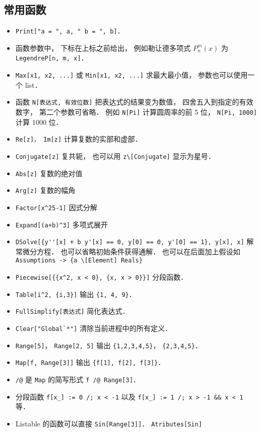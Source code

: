 \subsection{常用函数}
\begin{itemize}
\item \verb|Print["a = ", a, " b = ", b]|．
\item 函数参数中， 下标在上标之前给出， 例如勒让德多项式 $P_n^m(x)$ 为 \verb|LegendreP[n, m, x]|．
\item \verb|Max[x1, x2, ...]| 或 \verb|Min[x1, x2, ...]| 求最大最小值， 参数也可以使用一个 list．
\item 函数 \verb|N[表达式, 有效位数]| 把表达式的结果变为数值， 四舍五入到指定的有效数字， 第二个参数可省略． 例如 \verb|N[Pi]| 计算圆周率的前 5 位， \verb|N[Pi, 1000]| 计算 1000 位．
\item \verb|Re[z]， Im[z]| 计算复数的实部和虚部．
\item \verb|Conjugate[z]| 复共轭， 也可以用 \verb|z\[Conjugate]| 显示为星号．
\item \verb|Abs[z]| 复数的绝对值
\item \verb|Arg[z]| 复数的幅角
\item \verb|Factor[x^25-1]| 因式分解
\item \verb|Expand[(a+b)^3]| 多项式展开
\item \verb|DSolve[{y''[x] + b y'[x] == 0, y[0] == 0, y'[0] == 1}, y[x], x]| 解常微分方程． 也可以省略初始条件获得通解． 也可以在后面加上假设如 \verb|Assumptions -> {a \[Element] Reals}|
\item \verb|Piecewise[{{x^2, x < 0}, {x, x > 0}}]| 分段函数．
\item \verb|Table[i^2, {i,3}]| 输出 \verb|{1, 4, 9}|．
\item \verb|FullSimplify[表达式]| 简化表达式．
\item \verb|Clear["Global`*"]| 清除当前进程中的所有定义．
\item \verb|Range[5]|， \verb|Range[2, 5]| 输出 \verb|{1,2,3,4,5}|， \verb|{2,3,4,5}|．
\item \verb|Map[f, Range[3]]| 输出 \verb|{f[1], f[2], f[3]}|．
\item \verb|/@| 是 \verb|Map| 的简写形式 \verb|f /@ Range[3]|．
\item 分段函数 \verb|f[x_] := 0 /; x < -1| 以及 \verb|f[x_] := 1 /; x > -1 && x < 1| 等．
\item Listable 的函数可以直接 \verb|Sin[Range[3]]|． \verb|Atributes[Sin]|
\end{itemize}


